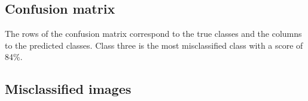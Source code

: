 \documentclass{article}
\begin{document}
\subsection{Confusion matrix}

    \begin{figure}[hbt!]
    \begin{floatrow}
	\end{floatrow}
	\end{figure}
	
The rows of the confusion matrix correspond to the true classes and the columns to the predicted classes. Class three is the most misclassified class with a score of 84\%. 

\newpage

\subsection{Misclassified images}
\end{document}
